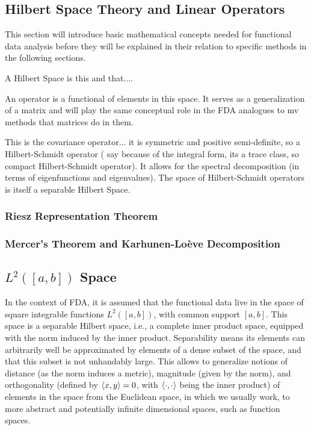 \subsection{Hilbert Space Theory and Linear Operators}
\label{sec:hilbert spaces}
This section will introduce basic mathematical concepts needed for functional data
analysis before they will be explained in their relation to specific methods in the
following sections.

A Hilbert Space is this and that....

An operator is a functional of elements in this space. It serves as a generalization of
a matrix and will play the same conceptual role in the FDA analogues to mv methods
that matrices do in them.

This is the covariance operator... it is symmetric and positive semi-definite, so
a Hilbert-Schmidt operator (\textcite{WangChiouMüller2016} say because of the integral form,
its a trace class, so compact Hilbert-Schmidt operator). It allows for the spectral
decomposition (in terms of eigenfunctions and eigenvalues). The space of Hilbert-Schmidt
operators is itself a separable Hilbert Space.

\subsubsection{Riesz Representation Theorem}
\label{sec:riesz}

\subsubsection{Mercer's Theorem and Karhunen-Loève Decomposition}
\label{sec:mercer and kh}

\subsection{$L^2([a, b])$ Space}
\label{sec:l2 space}
In the context of FDA, it is assumed that the functional data live in
the space of square integrable functions $L^2([a,b])$, with common
support $[a,b]$. This space is a separable Hilbert space, i.e., a complete inner
product space, equipped with the norm induced by the inner product. Separability means
its elements can arbitrarily well be approximated by elements of a dense subset of the
space, and that this subset is not unhandably large.
This allows to generalize notions of distance (as the norm induces a
metric), magnitude (given by the norm), and orthogonality (defined by
$\left \langle x, y \right \rangle = 0$, with $\left \langle \cdot, \cdot \right \rangle$ being the inner product) of elements
in the space from the Euclidean space, in which we usually work, to more
abstract and potentially infinite dimensional spaces, such as function
spaces.


